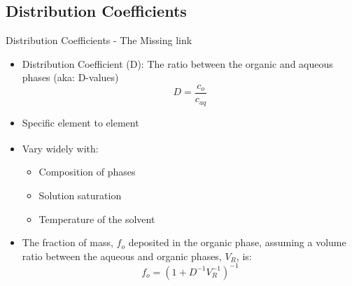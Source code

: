 \documentclass{beamer}
\newcommand{\tss}{\textsuperscript}
\begin{document}
\subsection{Distribution Coefficients}
\begin{frame}{Distribution Coefficients - The Missing link}
  \begin{itemize}
  \item{Distribution Coefficient (D): The ratio between the organic
  and aqueous phases (aka: D-values)}
    \begin{equation*}
      D=\frac{c_{o}}{c_{aq}}
    \end{equation*}
  \item{Specific element to element}
  \item{Vary widely with:\tss{\cite{stoller1961reactor}}}
    \begin{itemize}
    \item{Composition of phases}
    \item{Solution saturation}
    \item{Temperature of the solvent}
    \end{itemize}
  \item{The fraction of mass, $f_o$ deposited in the organic
    phase, assuming a volume ratio between
    the aqueous and organic phases, $V_R$, is:}
    \begin{equation*}
      f_o=(1+D^{-1}V^{-1}_R)^{-1}
    \end{equation*}
  \end{itemize}
\end{frame}
\end{document}
